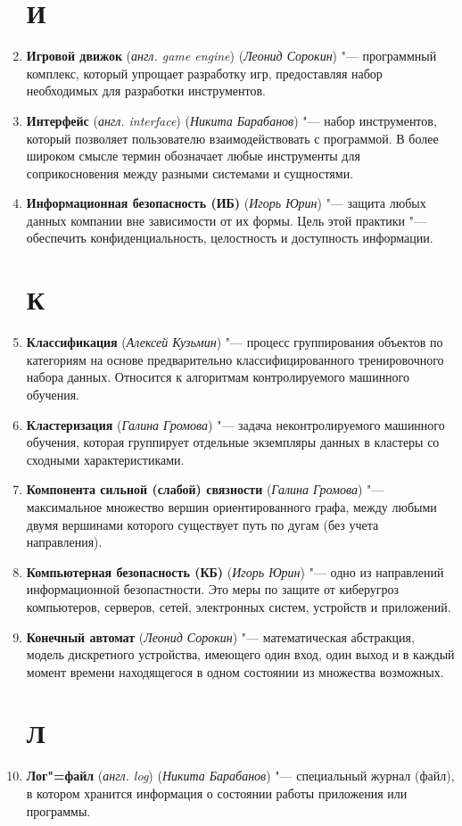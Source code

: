 \documentclass[14pt]{extarticle}
\begin{document}
\begin{enumerate}
    \section*{И}
    \item \textbf{Игровой движок} (\textit{англ. game engine}) (\textit{Леонид Сорокин}) "--- программный комплекс, который упрощает разработку игр, предоставляя набор необходимых для разработки инструментов.
    \item \textbf{Интерфейс} (\textit{англ. interface}) (\textit{Никита Барабанов}) "--- набор инструментов, который позволяет пользователю взаимодействовать с программой. В более широком смысле термин обозначает любые инструменты для соприкосновения между разными системами и сущностями.
    \item \textbf{Информационная безопасность (ИБ)} (\textit{Игорь Юрин}) "--- защита любых данных компании вне зависимости от их формы. Цель этой практики "--- обеспечить конфиденциальность, целостность и доступность информации.
    \section*{К}
    \item \textbf{Классификация} (\textit{Алексей Кузьмин}) "--- процесс группирования объектов по категориям на основе предварительно классифицированного тренировочного набора данных. Относится к алгоритмам контролируемого машинного обучения.
    \item \textbf{Кластеризация} (\textit{Галина Громова}) "--- задача неконтролируемого машинного обучения, которая группирует отдельные экземпляры данных в кластеры со сходными характеристиками.
    \item \textbf{Компонента сильной (слабой) связности} (\textit{Галина Громова}) "--- максимальное множество вершин ориентированного графа, между любыми двумя вершинами которого существует путь по дугам (без учета направления).
    \item \textbf{Компьютерная безопасность (КБ)} (\textit{Игорь Юрин}) "--- одно из направлений информационной безопастности. Это меры по защите от киберугроз компьютеров, серверов, сетей, электронных систем, устройств и приложений.
    \item \textbf{Конечный автомат} (\textit{Леонид Сорокин}) "--- математическая абстракция, модель дискретного устройства, имеющего один вход, один выход и в каждый момент времени находящегося в одном состоянии из множества возможных.
    \section*{Л}
    \item \textbf{Лог"=файл} (\textit{англ. log}) (\textit{Никита Барабанов}) "--- специальный журнал (файл), в котором хранится информация о состоянии работы приложения или программы.

\end{enumerate}
\end{document}
